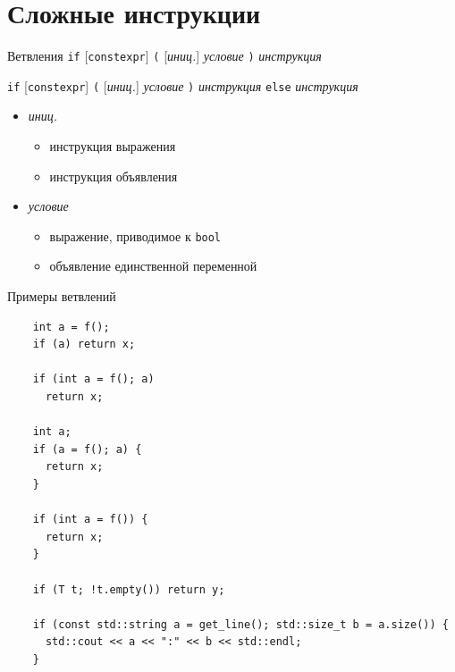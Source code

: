 \documentclass[unknownkeysallowed,xcolor=table]{beamer}
\begin{document}
\section{Сложные инструкции}

\begin{frame}[fragile]{Ветвления}
  \lstinline{if} [\lstinline{constexpr}] \lstinline{(} [\emph{иниц.}] \emph{условие} \lstinline{)} \emph{инструкция}

  \vspace{0.5em}

  \lstinline{if} [\lstinline{constexpr}] \lstinline{(} [\emph{иниц.}] \emph{условие} \lstinline{)} \emph{инструкция} \lstinline{else} \emph{инструкция}

  \vspace{0.5em}

  \begin{itemize}
    \item \emph{иниц.}
      \begin{itemize}
        \item инструкция выражения \vspace{0.5em}
        \item инструкция объявления \vspace{1em}
      \end{itemize}
    \item \emph{условие}
      \begin{itemize}
        \item выражение, приводимое к \lstinline{bool} \vspace{0.5em}
        \item объявление единственной переменной
      \end{itemize}
  \end{itemize}
\end{frame}

\begin{frame}[fragile]{Примеры ветвлений}
  \begin{lstlisting}
    int a = f();
    if (a) return x;

    if (int a = f(); a)
      return x;

    int a;
    if (a = f(); a) {
      return x;
    }

    if (int a = f()) {
      return x;
    }

    if (T t; !t.empty()) return y;

    if (const std::string a = get_line(); std::size_t b = a.size()) {
      std::cout << a << ":" << b << std::endl;
    }
  \end{lstlisting}
\end{frame}
\end{document}
